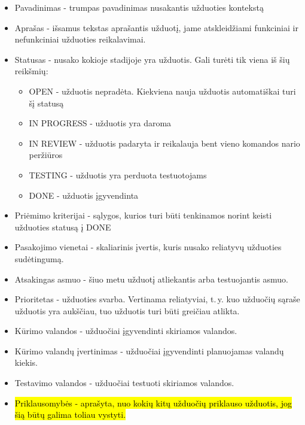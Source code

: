 {\begin{itemize}
    \item Pavadinimas - trumpas pavadinimas nusakantis užduoties kontekstą 
    \item Aprašas - išsamus tekstas aprašantis užduotį, jame atskleidžiami funkciniai ir nefunkciniai užduoties reikalavimai.
    \item Statusas - nusako kokioje stadijoje yra užduotis. Gali turėti tik viena iš šių reikšmių:
    \begin{itemize}
        \item OPEN - užduotis nepradėta. Kiekviena nauja užduotis automatiškai turi šį statusą
        \item IN PROGRESS - užduotis yra daroma
        \item IN REVIEW - užduotis padaryta ir reikalauja bent vieno komandos nario peržiūros
        \item TESTING - užduotis yra perduota testuotojams
        \item DONE - užduotis įgyvendinta
    \end{itemize}
    \item Priėmimo kriterijai - sąlygos, kurios turi būti tenkinamos norint keisti užduoties statusą į DONE
    \item Pasakojimo vienetai - skaliarinis įvertis, kuris nusako reliatyvų užduoties sudėtingumą.
    \item Atsakingas asmuo - šiuo metu užduotį atliekantis arba testuojantis asmuo.
    \item Prioritetas - užduoties svarba. Vertinama reliatyviai, t.\,y. kuo užduočių sąraše užduotis yra aukščiau, tuo užduotis turi būti greičiau atlikta.
    \item Kūrimo valandos - užduočiai įgyvendinti skiriamos valandos.
    \item Kūrimo valandų įvertinimas - užduočiai įgyvendinti planuojamas valandų kiekis.
    \item Testavimo valandos - užduočiai testuoti skiriamos valandos.
    \item \hl{Priklausomybės - aprašyta, nuo kokių kitų užduočių priklauso užduotis, jog šią būtų galima toliau vystyti.}
\end{itemize}

}


